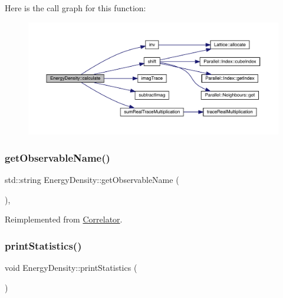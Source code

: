Here is the call graph for this function\+:
\nopagebreak
\begin{figure}[H]
\begin{center}
\leavevmode
\includegraphics[width=350pt]{class_energy_density_ae8e5e29257104d881bcabeadc3b2c9e7_cgraph}
\end{center}
\end{figure}
\mbox{\label{class_energy_density_a59b320595bca439333d36e3753ca07f0}} 
\subsubsection{\texorpdfstring{getObservableName()}{getObservableName()}}
{\footnotesize\ttfamily std\+::string Energy\+Density\+::get\+Observable\+Name (\begin{DoxyParamCaption}{ }\end{DoxyParamCaption})\hspace{0.3cm}{\ttfamily [inline]}, {\ttfamily [virtual]}}



Reimplemented from \mbox{\hyperlink{class_correlator_ad1fa59e864917c3e48da037f90c3488f}{Correlator}}.

\mbox{\label{class_energy_density_ad108e32bc670f17f15b4ed433d8bbec7}} 
\subsubsection{\texorpdfstring{printStatistics()}{printStatistics()}}
{\footnotesize\ttfamily void Energy\+Density\+::print\+Statistics (\begin{DoxyParamCaption}{ }\end{DoxyParamCaption})\hspace{0.3cm}{\ttfamily [virtual]}}



